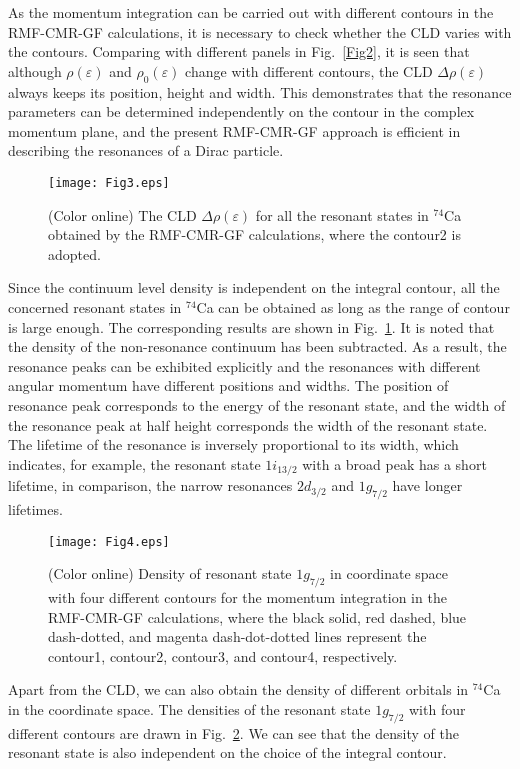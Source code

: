 \documentclass[twocolumn,prc,preprintnumbers,superscriptaddress,floatfix,showpacs]{revtex4}
\begin{document}
As the momentum integration can be carried out with different contours in the RMF-CMR-GF calculations, it is necessary to check whether the CLD varies with the contours. Comparing with different panels in Fig.~\ref{Fig2}, it is seen that although $\rho(\varepsilon)$ and $\rho_{0}(\varepsilon)$ change with different contours, the CLD $\Delta\rho(\varepsilon)$ always keeps its position, height and width. This demonstrates that the resonance parameters can be determined independently on the contour in the complex momentum plane, and the present RMF-CMR-GF approach is efficient in describing the resonances of a Dirac particle.

\begin{figure}%
\texttt{[image: Fig3.eps]}
\caption{(Color online) The CLD $\Delta\rho(\varepsilon)$ for all the resonant states in $^{74}$Ca obtained by the RMF-CMR-GF calculations, where the contour2 is adopted.}
\label{Fig3}
\end{figure}

Since the continuum level density is independent on the integral contour, all the concerned resonant states in $^{74}$Ca can be obtained as long as the range of contour is large enough. The corresponding results are shown in Fig.~\ref{Fig3}. It is noted that the density of the non-resonance continuum has been subtracted. As a result, the resonance peaks can be exhibited explicitly and the resonances with different angular momentum have different positions and widths. The position of resonance peak corresponds to the energy of the resonant state, and the width of the resonance peak at half height corresponds the width of the resonant state. The lifetime of the resonance is inversely proportional to its width, which indicates, for example, the resonant state $1i_{13/2}$ with a broad peak has a short lifetime, in comparison, the narrow resonances $2d_{3/2}$ and $1g_{7/2}$ have longer lifetimes.

\begin{figure}%
\texttt{[image: Fig4.eps]}
\caption{(Color online) Density of resonant state $1g_{7/2}$ in coordinate space with four different contours for the momentum integration in the RMF-CMR-GF calculations, where the black solid, red dashed, blue dash-dotted, and magenta dash-dot-dotted lines represent the contour1, contour2, contour3, and contour4, respectively.}
\label{Fig4}
\end{figure}

Apart from the CLD, we can also obtain the density of different orbitals in $^{74}$Ca in the coordinate space. The densities of the resonant state $1g_{7/2}$ with four different contours are drawn in Fig.~\ref{Fig4}. We can see that the density of the resonant state is also independent on the choice of the integral contour.
\end{document}

